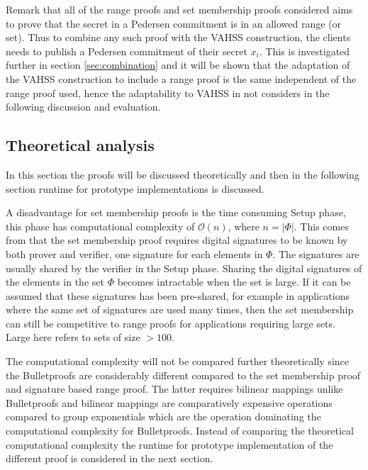 Remark that all of the range proofs and set membership proofs considered aims to prove that the secret in a Pedersen commitment is in an allowed range (or set). Thus to combine any such proof with the VAHSS construction, the clients needs to publish a Pedersen commitment of their secret $x_i$. This is investigated further in section \ref{sec:combination} and it will be shown that the adaptation of the VAHSS construction to include a range proof is the same independent of the range proof used, hence the adaptability to VAHSS in not considers in the  following discussion and evaluation.



\subsection{Theoretical analysis}
In this section the proofs will be discussed theoretically and then in the following section runtime for prototype implementations is  discussed.

A disadvantage for set membership proofs is the time consuming Setup phase, this phase has computational complexity of $\mathcal{O}(n)$, where $n=|\Phi|$. This comes from that the set membership proof requires digital signatures to be known by both prover and verifier, one signature for each elements in $\Phi$. The signatures are usually shared by the verifier in the Setup phase. Sharing the digital signatures of the elements in the set $\Phi$ becomes intractable when the set is large.  If it can be assumed that these signatures has been pre-shared, for example in applications where the same set of signatures are used many times, then the set membership can still be competitive to range proofs for applications requiring large sets. Large here refers to sets of size $>100$. 

The computational complexity will not be compared further theoretically since the Bulletproofs are considerably different compared to the set membership proof and signature based range proof. The latter requires bilinear mappings unlike Bulletproofs and bilinear mappings are comparatively expensive operations compared to group exponentials which are the operation dominating the computational complexity for Bulletproofs. Instead of comparing the theoretical computational complexity the runtime for prototype implementation of the different proof is considered in the next section. 

